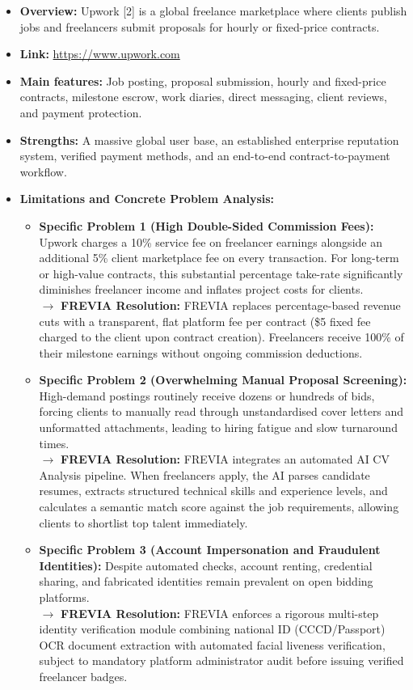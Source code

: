 \begin{itemize}[leftmargin=*]
\item \textbf{Overview:} Upwork [2] is a global freelance marketplace where clients publish jobs and freelancers submit proposals for hourly or fixed-price contracts.
\item \textbf{Link:} \url{https://www.upwork.com}
\item \textbf{Main features:} Job posting, proposal submission, hourly and fixed-price contracts, milestone escrow, work diaries, direct messaging, client reviews, and payment protection.
\item \textbf{Strengths:} A massive global user base, an established enterprise reputation system, verified payment methods, and an end-to-end contract-to-payment workflow.
\item \textbf{Limitations and Concrete Problem Analysis:}
    \begin{itemize}[leftmargin=*]
        \item \textbf{Specific Problem 1 (High Double-Sided Commission Fees):} Upwork charges a 10\% service fee on freelancer earnings alongside an additional 5\% client marketplace fee on every transaction. For long-term or high-value contracts, this substantial percentage take-rate significantly diminishes freelancer income and inflates project costs for clients.\\
        $\rightarrow$ \textbf{FREVIA Resolution:} FREVIA replaces percentage-based revenue cuts with a transparent, flat platform fee per contract (\$5 fixed fee charged to the client upon contract creation). Freelancers receive 100\% of their milestone earnings without ongoing commission deductions.
        \item \textbf{Specific Problem 2 (Overwhelming Manual Proposal Screening):} High-demand postings routinely receive dozens or hundreds of bids, forcing clients to manually read through unstandardised cover letters and unformatted attachments, leading to hiring fatigue and slow turnaround times.\\
        $\rightarrow$ \textbf{FREVIA Resolution:} FREVIA integrates an automated AI CV Analysis pipeline. When freelancers apply, the AI parses candidate resumes, extracts structured technical skills and experience levels, and calculates a semantic match score against the job requirements, allowing clients to shortlist top talent immediately.
        \item \textbf{Specific Problem 3 (Account Impersonation and Fraudulent Identities):} Despite automated checks, account renting, credential sharing, and fabricated identities remain prevalent on open bidding platforms.\\
        $\rightarrow$ \textbf{FREVIA Resolution:} FREVIA enforces a rigorous multi-step identity verification module combining national ID (CCCD/Passport) OCR document extraction with automated facial liveness verification, subject to mandatory platform administrator audit before issuing verified freelancer badges.
    \end{itemize}
\end{itemize}

